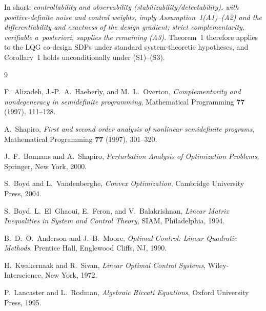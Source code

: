 \documentclass[11pt]{article}
\theoremstyle{definition}
\begin{document}
In short: \emph{controllability and observability (stabilizability/detectability),
with positive-definite noise and control weights, imply Assumption~1(A1)--(A2)
and the differentiability and exactness of the design gradient; strict
complementarity, verifiable a~posteriori, supplies the remaining (A3).} Theorem~1
therefore applies to the LQG co-design SDPs under standard system-theoretic
hypotheses, and Corollary~1 holds unconditionally under (S1)--(S3).

\begin{thebibliography}{9}

F.~Alizadeh, J.-P.~A.~Haeberly, and M.~L.~Overton,
\emph{Complementarity and nondegeneracy in semidefinite programming},
Mathematical Programming \textbf{77} (1997), 111--128.

A.~Shapiro,
\emph{First and second order analysis of nonlinear semidefinite programs},
Mathematical Programming \textbf{77} (1997), 301--320.

J.~F.~Bonnans and A.~Shapiro,
\emph{Perturbation Analysis of Optimization Problems},
Springer, New York, 2000.

S.~Boyd and L.~Vandenberghe,
\emph{Convex Optimization},
Cambridge University Press, 2004.

S.~Boyd, L.~El~Ghaoui, E.~Feron, and V.~Balakrishnan,
\emph{Linear Matrix Inequalities in System and Control Theory},
SIAM, Philadelphia, 1994.

B.~D.~O.~Anderson and J.~B.~Moore,
\emph{Optimal Control: Linear Quadratic Methods},
Prentice Hall, Englewood Cliffs, NJ, 1990.

H.~Kwakernaak and R.~Sivan,
\emph{Linear Optimal Control Systems},
Wiley-Interscience, New York, 1972.

P.~Lancaster and L.~Rodman,
\emph{Algebraic Riccati Equations},
Oxford University Press, 1995.

\end{thebibliography}
\end{document}
